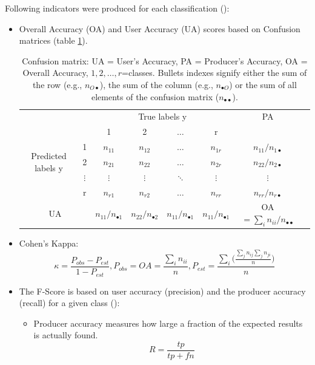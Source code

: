 \documentclass[10pt]{article}
\begin{document}
Following indicators were produced for each classification (\cite{deMorsier}):
\begin{itemize}
    \item Overall Accuracy (OA) and User Accuracy (UA) scores based on Confusion matrices (table \ref{table:cm}).
    \begin{table}[H]
		\centering
		\begin{tabular}{cc|c|c|c|c|cl}
			& & \multicolumn{4}{c|}{True labels y}&PA\\
			\multirow{5}{*}{Predicted labels y} &  & 1& 2& $\hdots$ &r  &\\ \cline{1-7} 
			& 1 &  $n_{11}$ & $n_{12}$ & $\hdots$ & $n_{1r}$& $n_{11}/n_{1\bullet}$ \\ \cline{2-7} 
			& 2 & $n_{21}$ & $n_{22}$ &$\hdots$  &$n_{2r}$ &$n_{22}/n_{2\bullet}$\\ \cline{2-7} 
			& $\vdots$ & $\vdots$ & $\vdots$ &$\ddots$  &$\vdots$&$\vdots$\\ \cline{2-7} 
			& r & $n_{r1}$ & $n_{r2}$ &$\hdots$  & $n_{rr}$ & $n_{rr}/n_{r\bullet}$ \\\cline{1-7} 
			\multicolumn{2}{c|}{UA} & $n_{11}/n_{\bullet 1}$ & $n_{22}/n_{\bullet 2}$ & $n_{11}/n_{\bullet 1}$ & $n_{11}/n_{\bullet 1}$ & OA$=\sum_in_{ii}/n_{\bullet\bullet}$\\
		\end{tabular}
		\caption{Confusion matrix: UA = User's Accuracy, PA = Producer's Accuracy, OA = Overall Accuracy, $1,2,\hdots,r$=classes. Bullets indexes signify either the sum of the row (e.g., $n_{O\bullet}$), the sum of the column (e.g., $n_{\bullet O}$) or the sum of all elements of the confusion matrix ($n_{\bullet\bullet}$).}
		\label{table:cm}
	\end{table}
	\item Cohen's Kappa:
	\begin{equation}
	    \kappa=\frac{P_{obs}-P_{est}}{1-P_{est}},P_{obs}=OA=\frac{\sum_in_{ii}}{n}, P_{est}=\frac{\sum_i\big(\frac{\sum_jn_{ij}\sum_jn_{ji}}{n}\big)}{n}
	\end{equation}
	\item The F-Score is based on user accuracy (precision) and the producer accuracy (recall) for a given class (\cite{zhang_f-measure_2009,ting_precision_2011}):
	\begin{itemize}
	    \item Producer accuracy measures how large a fraction of the expected results is actually found.
	    \begin{equation}
	        R=\frac{tp}{tp+fn}

\end{equation}
\end{itemize}
\end{itemize}
\end{document}
